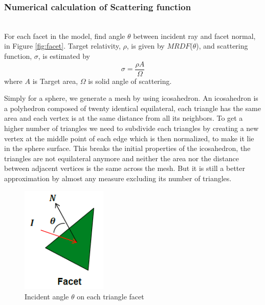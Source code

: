 \documentclass[11pt]{amsart}
\theoremstyle{definition}
\begin{document}
\subsubsection{Numerical calculation of Scattering function}~\\
For each facet in the model, find angle $\theta$ between incident ray and facet normal, in Figure \eqref{fig:facet}. Target relativity, $\rho$, is given by $MRDF$($\theta$), and scattering function, $\sigma$, is estimated by
\begin{equation}
\sigma =\frac{\rho A}{\Omega}
\end{equation} 
where $A$ is Target area, $\Omega$ is solid angle of scattering.

Simply for a sphere, we generate a mesh by using icosahedron. An icosahedron is a polyhedron composed of twenty identical equilateral, each triangle has the same area and each vertex is at the same distance from all its neighbors. To get a higher number of triangles we need to subdivide each triangles by creating a new vertex at the middle point of each edge which is then normalized, to make it lie in the sphere surface. This breaks the initial properties of the icosahedron, the triangles are not equilateral anymore and neither the area nor the distance between adjacent vertices is the same across the mesh. But it is still a better approximation by almost any measure excluding its number of triangles. 
\begin{figure}     	\centerline{\includegraphics[width=1.6in]{./figs/facet.png}}
		\caption{Incident angle $\theta$ on each triangle facet}
        \label{fig:facet}
\end{figure}
\end{document}
